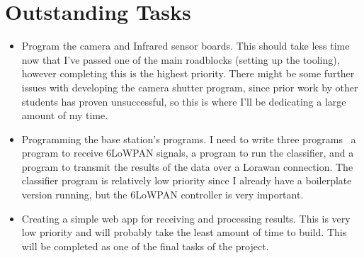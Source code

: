 \documentclass{article}
\begin{document}
\section*{Outstanding Tasks}

\begin{itemize}
    \item Program the camera and Infrared sensor boards. This should take
    less time now that I've passed one of the main roadblocks (setting up the
    tooling), however completing this is the highest priority. There might be
    some further issues with developing the camera shutter program, since
    prior work by other students has proven unsuccessful, so this is where
    I'll be dedicating a large amount of my time.
    \item Programming the base station's programs. I need to write three
    programs \textendash~a program to receive 6LoWPAN signals, a program to
    run the classifier, and a program to transmit the results of the data
    over a Lorawan connection. The classifier program is relatively low
    priority since I already have a boilerplate version running, but the
    6LoWPAN controller is very important.
    \item Creating a simple web app for receiving and processing results.
    This is very low priority and will probably take the least amount of time
    to build. This will be completed as one of the final tasks of the
    project.
\end{itemize}
\end{document}
